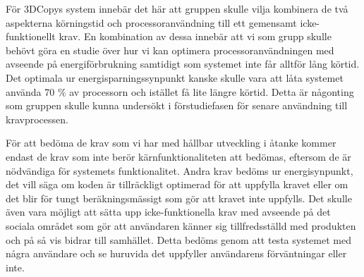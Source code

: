 För 3DCopys system innebär det här att gruppen skulle vilja kombinera de två aspekterna körningstid och processoranvändning till ett gemensamt icke-funktionellt krav. En kombination av dessa innebär att vi som grupp skulle behövt göra en studie över hur vi kan optimera processoranvändningen med avseende på energiförbrukning samtidigt som systemet inte får alltför lång körtid. Det optimala ur energisparningssynpunkt kanske skulle vara att låta systemet använda 70 \% av processorn och istället få lite längre körtid. Detta är någonting som gruppen skulle kunna undersökt i förstudiefasen för senare användning till kravprocessen.

För att bedöma de krav som vi har med hållbar utveckling i åtanke kommer endast de krav som inte berör kärnfunktionaliteten att bedömas, eftersom de är nödvändiga för systemets funktionalitet. Andra krav bedöms ur energisynpunkt, det vill säga om koden är tillräckligt optimerad för att uppfylla kravet eller om det blir för tungt beräkningsmässigt som gör att kravet inte uppfylls. Det skulle även vara möjligt att sätta upp icke-funktionella krav med avseende på det sociala området som gör att användaren känner sig tillfredsställd med produkten och på så vis bidrar till samhället. Detta bedöms genom att testa systemet med några användare och se huruvida det uppfyller användarens förväntningar eller inte.

